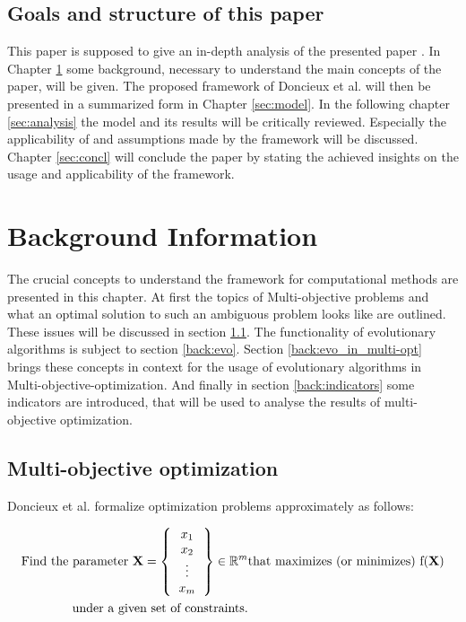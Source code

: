 \documentclass[12pt,twoside]{article}
\theoremstyle{plain}
\theoremstyle{definition}
\theoremstyle{remark}
\begin{document}
\subsection{Goals and structure of this paper}
This paper is supposed to give an in-depth analysis of the presented paper \cite{doncieux2015multi}.
In Chapter \ref{sec:background} some background, necessary to understand the main concepts of the paper, will be given.
The proposed framework of Doncieux et al. will then be presented in a summarized form in Chapter \ref{sec:model}.
In the following chapter \ref{sec:analysis} the model and its results will be critically reviewed.
Especially the applicability of and assumptions made by the framework will be discussed.
Chapter \ref{sec:concl} will conclude the paper by stating the achieved insights on the usage and applicability of the framework. 
\section{Background Information}
\label{sec:background}
The crucial concepts to understand the framework for computational methods are presented in this chapter.
At first the topics of Multi-objective problems and what an optimal solution to such an ambiguous problem looks like are outlined. These issues will be discussed in section \ref{back:multi-opt}. 
The functionality of evolutionary algorithms is subject to section \ref{back:evo}.
Section \ref{back:evo_in_multi-opt} brings these concepts in context for the usage of evolutionary algorithms in Multi-objective-optimization.
And finally in section \ref{back:indicators} some indicators are introduced, that will be used to analyse the results of multi-objective optimization.

\subsection{Multi-objective optimization}
\label{back:multi-opt}
Doncieux et al. \cite{doncieux2015multi} formalize optimization problems approximately as follows:

\begin{align*}
	\text{Find the parameter }\textbf{X} =
	\left \{
	\begin{tabular}{c}
		$x_1$\\
		$x_2$\\
		\vdots\\
		$x_m$
	\end{tabular}
	\right \}
	\in \mathbb{R}^m &\text{that maximizes (or minimizes) f(\textbf{X})}\\
		 \text{under a given set of constraints.}
\end{align*}
\end{document}

